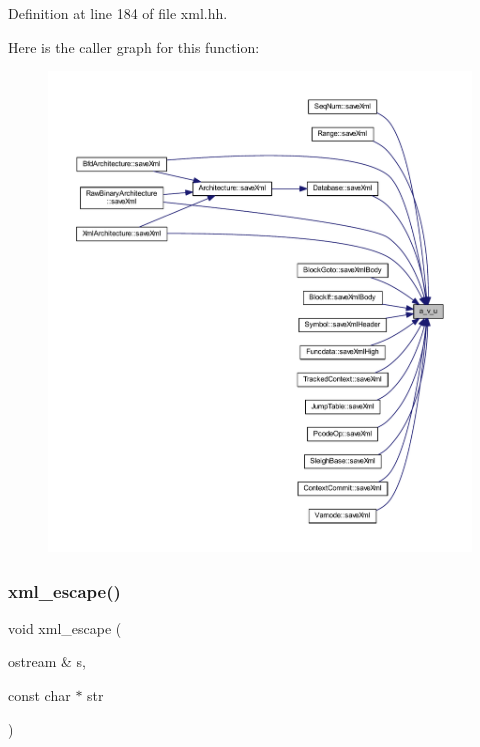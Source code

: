 Definition at line 184 of file xml.\+hh.

Here is the caller graph for this function\+:
\nopagebreak
\begin{figure}[H]
\begin{center}
\leavevmode
\includegraphics[width=350pt]{xml_8hh_af098b9ed0ffa95b5f853eb3f88ec7064_icgraph}
\end{center}
\end{figure}
\mbox{\label{xml_8hh_a18ba74ef06228bed0b1eff1f1abbb7ef}} 
\subsubsection{\texorpdfstring{xml\_escape()}{xml\_escape()}}
{\footnotesize\ttfamily void xml\+\_\+escape (\begin{DoxyParamCaption}\item[{ostream \&}]{s,  }\item[{const char $\ast$}]{str }\end{DoxyParamCaption})}

